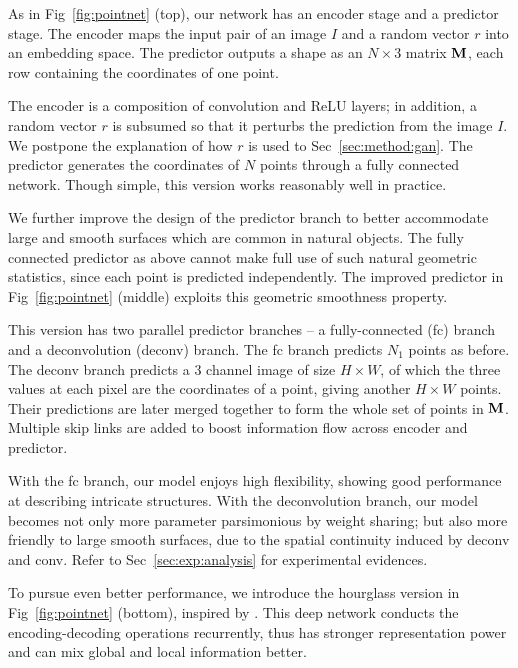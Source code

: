 \documentclass[10pt,twocolumn,letterpaper]{article}
\newcommand{\image}{I}
\begin{document}
As in Fig~\ref{fig:pointnet} (top), our network has an encoder stage and a predictor stage. The encoder maps the input pair of an image $\image$ and a random vector $r$ into an embedding space. The predictor outputs a shape as an $N\times 3$ matrix ${\bf M}$, each row containing the coordinates of one point.

The encoder is a composition of convolution and ReLU layers; in addition, a random vector $r$ is subsumed so that it perturbs the prediction from the image $I$. We postpone the explanation of how $r$ is used to Sec~\ref{sec:method:gan}. %
The predictor generates the coordinates of $N$ points through a fully connected network. Though simple, this version works reasonably well in practice. 

We further improve the design of the predictor branch to better accommodate large and smooth surfaces which are common in natural objects. The fully connected predictor as above cannot make full use of such natural geometric statistics, since each point is predicted independently. The improved predictor in Fig~\ref{fig:pointnet} (middle) exploits this geometric smoothness property. 

This version has two parallel predictor branches -- a fully-connected (fc) branch and a deconvolution (deconv) branch. The fc branch predicts $N_1$ points as before. The deconv branch predicts a 3 channel image of size $H\times W$, of which the three values at each pixel are the coordinates of a point, giving another $H\times W$ points. Their predictions are later merged together to form the whole set of points in ${\bf M}$. Multiple skip links are added to boost information flow across encoder and predictor. 

With the fc branch, our model enjoys high flexibility, showing good performance at describing intricate structures. With the deconvolution branch, our model becomes not only more parameter parsimonious by weight sharing; but also more friendly to large smooth surfaces, due to the spatial continuity induced by deconv and conv. Refer to Sec~\ref{sec:exp:analysis} for experimental evidences. 

To pursue even better performance, we introduce the hourglass version in Fig~\ref{fig:pointnet} (bottom), inspired by \cite{newell2016stacked}. This deep network conducts the encoding-decoding operations recurrently, thus has stronger representation power and can mix global and local information better. 
\end{document}
